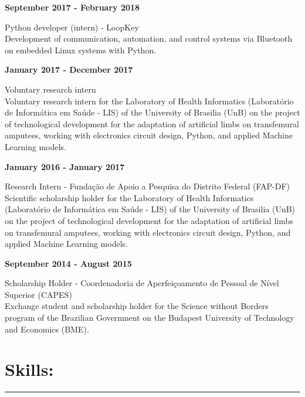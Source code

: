 \documentclass[11pt]{article}
\begin{document}
\textbf{September 2017 - February 2018}
\begin{addmargin}{0.5cm}
Python developer (intern) - LoopKey\\
Development of communication, automation, and control systems via Bluetooth on
embedded Linux systems with Python. \\
\end{addmargin}

\textbf{January 2017 - December 2017}
\begin{addmargin}{0.5cm}
Voluntary research intern\\
Voluntary research intern for the Laboratory of Health Informatics
(Laboratório de Informática em Saúde - LIS) of the University of
Brasilia (UnB) on the project of technological development for the adaptation of artificial limbs on transfemural amputees, working with electronics circuit design, Python, and applied Machine Learning models. \\
\end{addmargin}

\textbf{January 2016 - January 2017}
\begin{addmargin}{0.5cm}
Research Intern - Fundação de Apoio a Pesquisa do Distrito Federal (FAP-DF)\\
Scientific scholarship holder for the Laboratory of Health Informatics
(Laboratório de Informática em Saúde - LIS) of the University of
Brasilia (UnB) on the project of technological development for the adaptation of artificial
limbs on transfemural amputees, working with electronics circuit design, Python, and applied
Machine Learning models. \\
\end{addmargin}

\newpage
\textbf{September 2014 - August 2015}
\begin{addmargin}{0.5cm}
Scholarship Holder - Coordenadoria de Aperfeiçoamento de Pessoal de Nível Superior (CAPES)\\
Exchange student and scholarship holder for the Science without Borders program of the Brazilian
Government on the Budapest University of Technology and Economics (BME). \\
\end{addmargin}


\section{Skills:}
\hrule \vspace{0.1cm}
\end{document}
